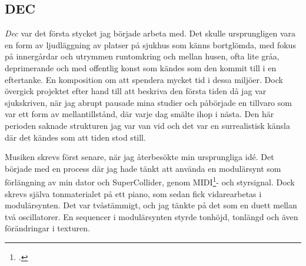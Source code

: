 \documentclass{article}
\begin{document}



\subsection{DEC}
\emph{Dec} var det första stycket jag började arbeta med. Det skulle ursprungligen vara en form av ljudläggning
av platser på sjukhus som känns bortglömda, med fokus på innergårdar och utrymmen runtomkring och mellan
husen, ofta lite gråa, deprimerande och med offentlig konst som kändes som den kommit till i en eftertanke. En
komposition om att spendera mycket tid i dessa miljöer. Dock övergick projektet efter hand till att beskriva
den första tiden då jag var sjukskriven, när jag abrupt pausade mina studier och påbörjade en tillvaro som var
ett form av mellantillstånd, där varje dag smälte ihop i nästa. Den här perioden saknade strukturen jag var
van vid och det var en surrealistisk känsla där det kändes som att tiden stod still.

Musiken skrevs först senare, när jag återbesökte min ursprungliga idé. Det började med en process där jag hade
tänkt att använda en modulärsynt som förlängning av min dator och SuperCollider, genom
MIDI\footcite{midi}- och styrsignal. 
Dock skrevs själva tonmaterialet på ett piano, som sedan fick vidarearbetas i modulärsynten. Det var
tvåstämmigt, och jag tänkte på det som en duett mellan två oscillatorer. En sequencer i modulärsynten styrde 
tonhöjd, tonlängd och även förändringar i texturen. 
\end{document}
